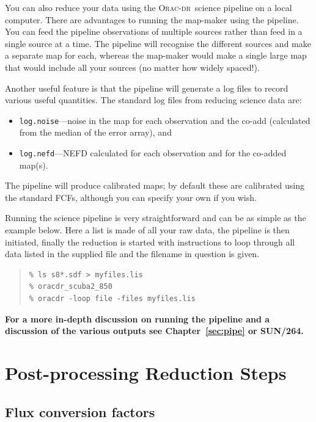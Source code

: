 \documentclass[twoside,11pt]{article}
\newcommand{\htmladdnormallink}[2]{#1}
\newcommand{\htmlref}[2]{#1}
\newcommand{\latexhtml}[2]{#1}
\newcommand{\xref}[3]{#1}
\newcommand{\xlabel}[1]{}
\renewcommand{\_}{\texttt{\symbol{95}}}
\newenvironment{myquote}{
   \color{MidnightBlue}\begin{quote}\begin{small}}{
   \end{small}\end{quote}
}
\newcommand{\oracdr}{\htmladdnormallink{\textsc{Orac-dr}}{http://www.oracdr.org/oracdr}}
\newcommand{\file}[1]{\texttt{#1}}
\newcommand{\pipelinesun}{\xref{\textbf{SUN/264}}{sun264}{}}
\newcommand{\cref}[3]{\latexhtml{#1~\ref{#2}}{\htmlref{#3}{#2}}}
\renewenvironment{myquote}{
      \begin{quote}\begin{small}}{
      \end{small}\end{quote}
   }
\begin{document}
You can also reduce your data using the \oracdr\ science pipeline on a
local computer. There are advantages to running the map-maker using
the pipeline. You can feed the pipeline observations of multiple
sources rather than feed in a single source at a time. The pipeline
will recognise the different sources and make a separate map for each,
whereas the map-maker would make a single large map that would include
all your sources (no matter how widely spaced!).

Another useful feature is that the pipeline will generate a log files to record
various useful quantities. The standard log files from reducing
science data are:

\begin{itemize}
\item \file{log.noise}---noise in the map for each observation and the co-add
(calculated from the median of the error array), and
\item \file{log.nefd}---NEFD calculated for each observation and for
the co-added map(s).
\end{itemize}
The pipeline will produce calibrated maps; by default these are
calibrated using the standard FCFs, although you can specify your
own if you wish.

Running the science pipeline is very straightforward and can be as
simple as the example below. Here a list is made of all your raw data,
the pipeline is then initiated, finally the reduction is started with
instructions to loop through all data listed in the supplied file and
the filename in question is given.

\begin{myquote}
\begin{verbatim}
% ls s8*.sdf > myfiles.lis
% oracdr_scuba2_850
% oracdr -loop file -files myfiles.lis
\end{verbatim}
\end{myquote}

\textbf{For a more in-depth discussion on running the pipeline and a discussion
of the various outputs see \cref{Chapter}{sec:pipe}{The SCUBA-2
Pipeline} or \pipelinesun.}
\clearpage


\section{\xlabel{postprocess}Post-processing Reduction Steps}
\label{sec:postprocess}

\subsection{\xlabel{apply_fcf}Flux conversion factors}
\label{sec:cmult}
\end{document}
